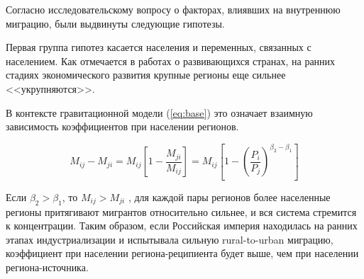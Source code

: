 \documentclass[a4paper,12pt]{article}
\begin{document}
Согласно исследовательскому вопросу о факторах, влиявших на внутреннюю миграцию, были выдвинуты следующие гипотезы.

Первая группа гипотез касается населения и переменных, связанных с населением. Как отмечается в работах о развивающихся странах, на ранних стадиях экономического развития крупные регионы еще сильнее <<укрупняются>>.


В контексте гравитационной модели (\ref{eq:base}) это означает взаимную зависимость коэффициентов при населении регионов.

\begin{equation}\label{eq:comeback}
	M_{ij} - M_{ji} = M_{ij} \left[ 1 - \frac{M_{ji}}{M_{ij}} \right] = M_{ij} \left[ 1 - \left( \frac{P_i}{P_j} \right)^{\beta_2 - \beta_1} \right]
\end{equation}

Если $\beta_2 > \beta_1$, то $M_{ij} > M_{ji}$ \citep{poot_gravity_2016}, для каждой пары регионов более населенные регионы притягивают мигрантов относительно сильнее, и вся система стремится к концентрации. Таким образом, если Российская империя находилась на ранних этапах индустриализации и испытывала сильную rural-to-urban миграцию, коэффициент при населении региона-реципиента будет выше, чем при населении региона-источника.
\end{document}
